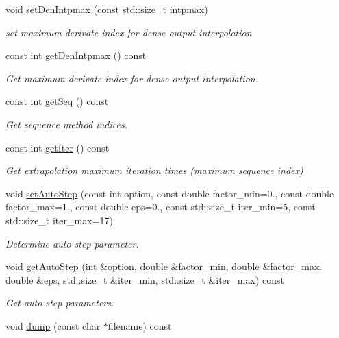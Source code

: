 \begin{DoxyCompactItemize}
void \hyperlink{classARC_1_1chainpars_a781752a80e105c87925359d85f34fc4d}{set\+Den\+Intpmax} (const std\+::size\+\_\+t intpmax)
\begin{DoxyCompactList}\small\item\em set maximum derivate index for dense output interpolation \end{DoxyCompactList}\item 
const int \hyperlink{classARC_1_1chainpars_a3dfd113a3a3e36af97537c024d36c2bd}{get\+Den\+Intpmax} () const
\begin{DoxyCompactList}\small\item\em Get maximum derivate index for dense output interpolation. \end{DoxyCompactList}\item 
const int \hyperlink{classARC_1_1chainpars_a3dda52dfc721423b218c86022c3aca90}{get\+Seq} () const
\begin{DoxyCompactList}\small\item\em Get sequence method indices. \end{DoxyCompactList}\item 
const int \hyperlink{classARC_1_1chainpars_acabcaa74a61c1d7304e1206f985ec3e9}{get\+Iter} () const
\begin{DoxyCompactList}\small\item\em Get extrapolation maximum iteration times (maximum sequence index) \end{DoxyCompactList}\item 
void \hyperlink{classARC_1_1chainpars_a2aa8600eba0330eb16c122a58edbb465}{set\+Auto\+Step} (const int option, const double factor\+\_\+min=0., const double factor\+\_\+max=1., const double eps=0., const std\+::size\+\_\+t iter\+\_\+min=5, const std\+::size\+\_\+t iter\+\_\+max=17)
\begin{DoxyCompactList}\small\item\em Determine auto-\/step parameter. \end{DoxyCompactList}\item 
void \hyperlink{classARC_1_1chainpars_a5ae2c706ee7f54b60d64efe97939c6b1}{get\+Auto\+Step} (int \&option, double \&factor\+\_\+min, double \&factor\+\_\+max, double \&eps, std\+::size\+\_\+t \&iter\+\_\+min, std\+::size\+\_\+t \&iter\+\_\+max) const
\begin{DoxyCompactList}\small\item\em Get auto-\/step parameters. \end{DoxyCompactList}\item 
void \hyperlink{classARC_1_1chainpars_aa74f5c25fdd13f5bccc4efbee672dd44}{dump} (const char $\ast$filename) const

\end{DoxyCompactItemize}
